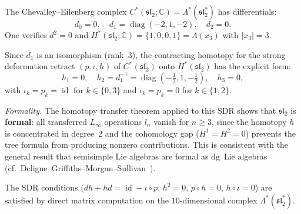 \begin{computation}
\label{comp:sl2-ce-sdr}
\ClaimStatusProvedHere
{}

The Chevalley--Eilenberg complex
$C^*(\mathfrak{sl}_2; \mathbb{C})
= \Lambda^*(\mathfrak{sl}_2^*)$
has differentials:
\begin{equation}\label{eq:sl2-ce-diff}
d_0 = 0, \quad
d_1 = \operatorname{diag}(-2, 1, -2), \quad
d_2 = 0.
\end{equation}
One verifies $d^2 = 0$ and
$H^*(\mathfrak{sl}_2; \mathbb{C}) = \{1, 0, 0, 1\}
= \Lambda(x_3)$ with $|x_3| = 3$.

Since $d_1$ is an isomorphism (rank~3), the contracting homotopy
for the strong deformation retract
$(p, \iota, h)$ of
$C^*(\mathfrak{sl}_2)$
onto $H^*(\mathfrak{sl}_2)$
has the explicit form:
\begin{equation}\label{eq:sl2-sdr}
h_1 = 0, \quad
h_2 = d_1^{-1} = \operatorname{diag}(-\tfrac{1}{2}, 1, -\tfrac{1}{2}), \quad
h_3 = 0,
\end{equation}
with $\iota_k = p_k = \operatorname{id}$ for $k \in \{0, 3\}$
and $\iota_k = p_k = 0$ for $k \in \{1, 2\}$.

\emph{Formality.}
The homotopy transfer theorem applied to this SDR shows that
$\mathfrak{sl}_2$ is \textbf{formal}: all transferred $L_\infty$
operations $l_n$ vanish for $n \geq 3$, since the homotopy $h$
is concentrated in degree~2 and the cohomology gap
($H^1 = H^2 = 0$) prevents the tree formula from producing
nonzero contributions. This is consistent with the general
result that semisimple Lie algebras are formal as dg~Lie algebras
(cf.\ Deligne--Griffiths--Morgan--Sullivan~\cite{DGMS75}).

The SDR conditions
($dh + hd = \operatorname{id} - \iota \circ p$,
$h^2 = 0$, $p \circ h = 0$, $h \circ \iota = 0$)
are satisfied by direct matrix computation on the
$10$-dimensional complex $\Lambda^*(\mathfrak{sl}_2^*)$.
\end{computation}

